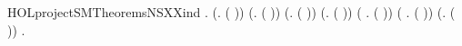 \begin{SaveVerbatim}{HOLprojectSMTheoremsNSXXind}
\HOLTokenTurnstile{} \HOLSymConst{\HOLTokenForall{}}.
     (\HOLSymConst{\HOLTokenForall{}}.   ( )) \HOLSymConst{\HOLTokenConj{}} (\HOLSymConst{\HOLTokenForall{}}.   ( )) \HOLSymConst{\HOLTokenConj{}}
     (\HOLSymConst{\HOLTokenForall{}}.   ( )) \HOLSymConst{\HOLTokenConj{}} (\HOLSymConst{\HOLTokenForall{}}.   ( )) \HOLSymConst{\HOLTokenConj{}}
     (\HOLSymConst{\HOLTokenForall{}} .   ( )) \HOLSymConst{\HOLTokenConj{}} (\HOLSymConst{\HOLTokenForall{}} .   ( )) \HOLSymConst{\HOLTokenConj{}}
     (\HOLSymConst{\HOLTokenForall{}}.   ( )) \HOLSymConst{\HOLTokenImp{}}
     \HOLSymConst{\HOLTokenForall{}} .   
\end{SaveVerbatim}
\newcommand{\HOLprojectSMTheoremsNSXXind}{\UseVerbatim{HOLprojectSMTheoremsNSXXind}}
\newcommand{\HOLprojectSMTheorems}{
\HOLThmTag{projectSM}{NOut_def}\HOLprojectSMTheoremsNOutXXdef
\HOLThmTag{projectSM}{NOut_ind}\HOLprojectSMTheoremsNOutXXind
\HOLThmTag{projectSM}{NS_def}\HOLprojectSMTheoremsNSXXdef
\HOLThmTag{projectSM}{NS_ind}\HOLprojectSMTheoremsNSXXind
}
